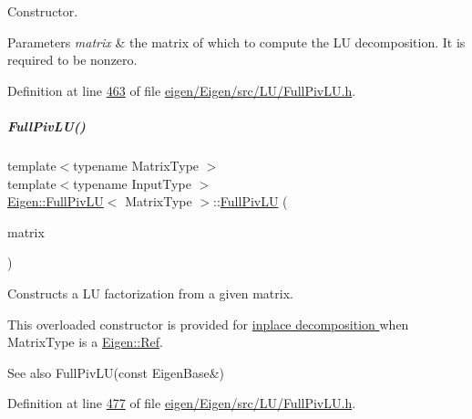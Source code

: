 Constructor.


\begin{DoxyParams}{Parameters}
{\em matrix} & the matrix of which to compute the LU decomposition. It is required to be nonzero. \\
\hline
\end{DoxyParams}


Definition at line \hyperlink{eigen_2_eigen_2src_2_l_u_2_full_piv_l_u_8h_source_l00463}{463} of file \hyperlink{eigen_2_eigen_2src_2_l_u_2_full_piv_l_u_8h_source}{eigen/\+Eigen/src/\+L\+U/\+Full\+Piv\+L\+U.\+h}.

\mbox{\label{group___l_u___module_a3e903b9f401e3fc5d1ca7c6951c76185}} 
\subparagraph{\texorpdfstring{Full\+Piv\+L\+U()}{FullPivLU()}\hspace{0.1cm}{\footnotesize\ttfamily [4/8]}}
{\footnotesize\ttfamily template$<$typename Matrix\+Type $>$ \\
template$<$typename Input\+Type $>$ \\
\hyperlink{group___l_u___module_class_eigen_1_1_full_piv_l_u}{Eigen\+::\+Full\+Piv\+LU}$<$ Matrix\+Type $>$\+::\hyperlink{group___l_u___module_class_eigen_1_1_full_piv_l_u}{Full\+Piv\+LU} (\begin{DoxyParamCaption}\item[{\hyperlink{group___core___module_struct_eigen_1_1_eigen_base}{Eigen\+Base}$<$ Input\+Type $>$ \&}]{matrix }\end{DoxyParamCaption})\hspace{0.3cm}{\ttfamily [explicit]}}



Constructs a LU factorization from a given matrix. 

This overloaded constructor is provided for \hyperlink{group___inplace_decomposition}{inplace decomposition } when {\ttfamily Matrix\+Type} is a \hyperlink{group___core___module_class_eigen_1_1_ref}{Eigen\+::\+Ref}.

\begin{DoxySeeAlso}{See also}
Full\+Piv\+L\+U(const Eigen\+Base\&) 
\end{DoxySeeAlso}


Definition at line \hyperlink{eigen_2_eigen_2src_2_l_u_2_full_piv_l_u_8h_source_l00477}{477} of file \hyperlink{eigen_2_eigen_2src_2_l_u_2_full_piv_l_u_8h_source}{eigen/\+Eigen/src/\+L\+U/\+Full\+Piv\+L\+U.\+h}.

